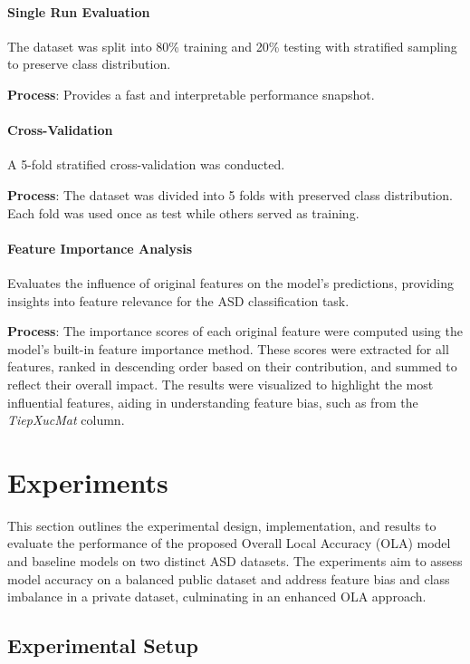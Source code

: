 \documentclass[conference]{IEEEtran}
\begin{document}
\paragraph{Single Run Evaluation}

The dataset was split into 80\% training and 20\% testing with stratified sampling to preserve class distribution.  

\textbf{Process}: Provides a fast and interpretable performance snapshot.

\paragraph{Cross-Validation}

A 5-fold stratified cross-validation was conducted.  

\textbf{Process}: The dataset was divided into 5 folds with preserved class distribution. Each fold was used once as test while others served as training.  

\paragraph{Feature Importance Analysis}

Evaluates the influence of original features on the model's predictions, providing insights into feature relevance for the ASD classification task.

\textbf{Process}: The importance scores of each original feature were computed using the model's built-in feature importance method. These scores were extracted for all features, ranked in descending order based on their contribution, and summed to reflect their overall impact. The results were visualized to highlight the most influential features, aiding in understanding feature bias, such as from the \textit{TiepXucMat} column.

\section{Experiments}
This section outlines the experimental design, implementation, and results to evaluate the performance of the proposed Overall Local Accuracy (OLA) model and baseline models on two distinct ASD datasets. The experiments aim to assess model accuracy on a balanced public dataset and address feature bias and class imbalance in a private dataset, culminating in an enhanced OLA approach.

\subsection{Experimental Setup}
\end{document}
